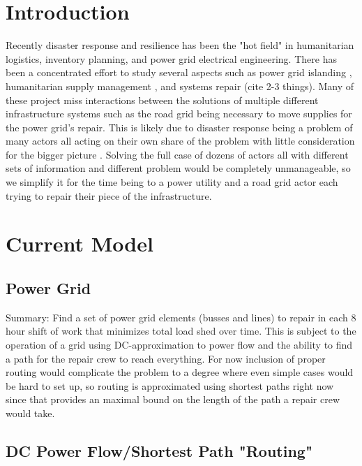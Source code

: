 \documentclass{article}
\begin{document}
	\section{Introduction}
	Recently disaster response and resilience has been the "hot field" in humanitarian logistics, inventory planning, and power grid electrical engineering. There has been a concentrated effort to study several aspects such as power grid islanding \cite{PanteliEA2016} \cite{DeepjyotiEA2018}, humanitarian supply management \cite{JiangEA2012} \cite{CaunhyeEA2012}, and systems repair (cite 2-3 things). Many of these project miss interactions between the solutions of multiple different infrastructure systems such as the road grid being necessary to move supplies for the power grid's repair. This is likely due to disaster response being a problem of many actors all acting on their own share of the problem with little consideration for the bigger picture\cite{VerasEA2012} . Solving the full case of dozens of actors all with different sets of information and different problem would be completely unmanageable, so we simplify it for the time being to a power utility and a road grid actor each trying to repair their piece of the infrastructure.
	
	\section{Current Model}
	\subsection{Power Grid}
	Summary: Find a set of power grid elements (busses and lines) to repair in each 8 hour shift of work that minimizes total load shed over time. This is subject to the operation of a grid using DC-approximation to power flow and the ability to find a path for the repair crew to reach everything. For now inclusion of proper routing would complicate the problem to a degree where even simple cases would be hard to set up, so routing is approximated using shortest paths right now since that provides an maximal bound on the length of the path a repair crew would take. 
	
	\subsection{DC Power Flow/Shortest Path "Routing"}	
\end{document}
